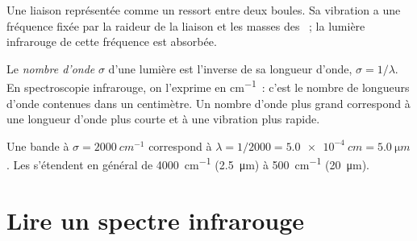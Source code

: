 \begin{omfigure}

{\small Une liaison représentée comme un ressort entre deux boules. Sa
vibration a une fréquence fixée par la raideur de la liaison et les
masses des ~; la lumière infrarouge de cette fréquence est
absorbée.}
\end{omfigure}

\begin{definition}\label{def:g11:infrared:wavenumber}
Le \emph{nombre d'onde} $\sigma$ d'une lumière est
l'inverse de sa longueur d'onde, $\sigma = 1/\lambda$. En spectroscopie
infrarouge, on l'exprime en \si{cm^{-1}}~: c'est le nombre de longueurs
d'onde contenues dans un centimètre. Un nombre d'onde plus grand
correspond à une longueur d'onde plus courte et à une vibration plus
rapide.
\end{definition}

\begin{example}\label{ex:g11:infrared:convert}
Une bande à $\sigma = \qty{2000}{cm^{-1}}$ correspond à
$\lambda = 1/2000 = \qty{5.0e-4}{cm} = \qty{5.0}{\micro m}$. Les  s'étendent en général de \qty{4000}{cm^{-1}}
(\qty{2.5}{\micro m}) à \qty{500}{cm^{-1}} (\qty{20}{\micro m}).
\end{example}

\section{Lire un spectre infrarouge}

